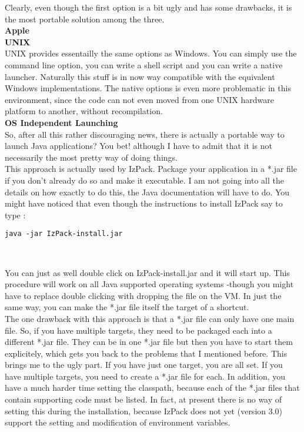 Clearly, even though the first option is a bit ugly and has some
drawbacks, it is the most portable solution among the three.\\

\textbf{Apple}\\

\textbf{UNIX}\\

UNIX provides essentailly the same options as Windows. You can simply
use the command line option, you can write a shell script and you can
write a native launcher. Naturally this stuff is in now way compatible
with the equivalent Windows implementations. The native options is even
more problematic in this environment, since the code can not even moved
from one UNIX hardware platform to another, without recompilation.\\

\textbf{OS Independent Launching}\\

So, after all this rather discouraging news, there is actually a
portable way to launch Java applications? You bet! although I have to
admit that it is not necessarily the most pretty way of doing things.\\

This approach is actually used by IzPack. Package your application in a
*.jar file if you don't already do so and make it executable. I am not
going into all the details on how exactly to do this, the Java
documentation will have to do. You might have noticed that even though
the instructions to install IzPack say to type :
\begin{verbatim}
java -jar IzPack-install.jar
\end{verbatim}\

You can just as well double click on IzPack-install.jar and it will
start up. This procedure will work on all Java supported operating
systems -though you might have to replace double clicking with dropping
the file on the VM. In just the same way, you can make the *.jar file
itself the target of a shortcut.\\

The one drawback with this approach is that a *.jar file can only have
one main file. So, if you have multiple targets, they need to be
packaged each into a different *.jar file. They can be in one *.jar file
but then you have to start them explicitely, which gets you back to the
problems that I mentioned before. This brings me to the ugly part. If
you have just one target, you are all set. If you have multiple targets,
you need to create a *.jar file for each. In addition, you have a much
harder time setting the classpath, because each of the *.jar files that
contain supporting code must be listed. In fact, at present there is no
way of setting this during the installation, because IzPack does not yet
(version 3.0) support the setting and modification of environment
variables.\\

